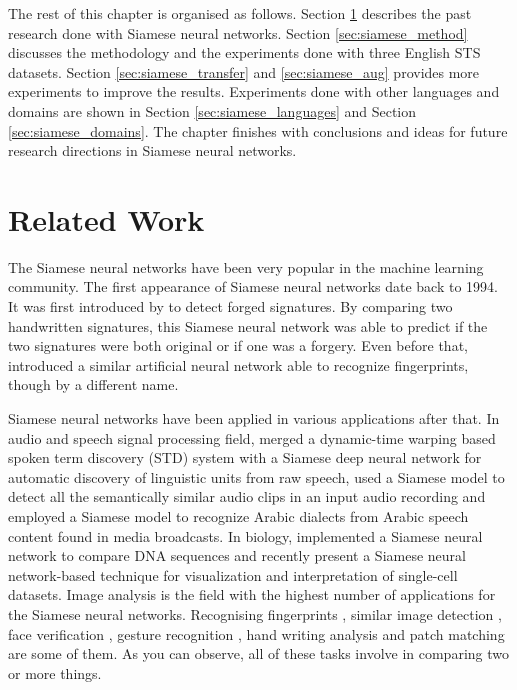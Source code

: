 The rest of this chapter is organised as follows. Section \ref{sec:siamese_related} describes the past research done with Siamese neural networks. Section \ref{sec:siamese_method} discusses the methodology and the experiments done with three English STS datasets. Section \ref{sec:siamese_transfer} and \ref{sec:siamese_aug} provides more experiments to improve the results. Experiments done with other languages and domains are shown in Section \ref{sec:siamese_languages} and Section \ref{sec:siamese_domains}. The chapter finishes with conclusions and ideas for future research directions in Siamese neural networks. 


\section{Related Work}
\label{sec:siamese_related}

The Siamese neural networks have been very popular in the machine learning community. The first appearance of Siamese neural networks date back to 1994. It was first introduced by \citet{doi:10.1142/S0218001493000339} to detect forged signatures. By comparing two handwritten signatures, this Siamese neural network was able to predict if the two signatures were both original or if one was a forgery. Even before that, \citet{6797067} introduced a similar artificial neural network able to recognize fingerprints, though by a different name. 

Siamese neural networks have been applied in various applications after that. In audio and speech signal processing field, \citet{thiolliere2015hybrid} merged a dynamic-time warping based spoken term discovery (STD) system with a Siamese deep neural network for automatic discovery of linguistic units from raw speech, \citet{8461524} used a Siamese model to detect all the semantically similar audio clips in an input audio recording and \citet{8268960} employed a Siamese model to recognize Arabic dialects from Arabic speech content found in media broadcasts. In biology, \citet{10.1093/bioinformatics/bty887} implemented a Siamese neural network to compare DNA sequences and recently \citet{Szubert2019} present a Siamese neural network-based technique for visualization and interpretation of single-cell datasets. Image analysis is the field with the highest number of applications for the Siamese neural networks. Recognising fingerprints \cite{6797067}, similar image detection \cite{1467314,rs10020355,21be1428c6a44fb7a32d49ba83126bcb,6976727,6636646}, face verification \cite{Taigman_2014_CVPR}, gesture recognition \cite{7163112}, hand writing analysis \cite{8269987} and patch matching \cite{HANIF201954} are some of them. As you can observe, all of these tasks involve in comparing two or more things.

